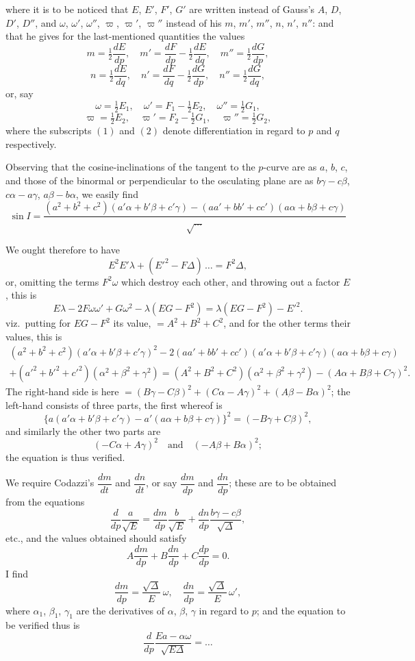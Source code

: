 \documentclass[11pt,a4paper]{book}
\begin{document}
where it is to be noticed that $E$, $E'$, $F'$, $G'$ are written instead of Gauss's $A$, $D$, $D'$, $D''$,
and $\omega$, $\omega'$, $\omega''$, $\varpi$, $\varpi'$, $\varpi''$ instead of his $m$, $m'$, $m''$, $n$, $n'$, $n''$:
and that he gives for the last-mentioned quantities the values
\[
m = \tfrac12\frac{dE}{dp}, \quad m' = \frac{dF}{dp} - \tfrac12\frac{dE}{dq}, \quad
m'' = \tfrac12\frac{dG}{dp},
\]
\[
n = \tfrac12\frac{dE}{dq}, \quad n' = \frac{dF}{dq} - \tfrac12\frac{dG}{dp}, \quad
n'' = \tfrac12\frac{dG}{dq},
\]
or, say
\[
\omega = \tfrac12 E_1, \quad \omega' = F_1 - \tfrac12 E_2, \quad \omega'' = \tfrac12 G_1,
\]
\[
\varpi = \tfrac12 E_2, \quad \varpi' = F_2 - \tfrac12 G_1, \quad \varpi'' = \tfrac12 G_2,
\]
where the subscripts $(1)$ and $(2)$ denote differentiation in regard to $p$ and $q$ respectively.

Observing that the cosine-inclinations of the tangent to the $p$-curve are as $a$, $b$, $c$,
and those of the binormal or perpendicular to the osculating plane are as $b\gamma - c\beta$,
$c\alpha - a\gamma$, $a\beta - b\alpha$, we easily find
\[
\sin I = \frac{(a^2+b^2+c^2)(a'\alpha+b'\beta+c'\gamma) - (aa'+bb'+cc')(a\alpha+b\beta+c\gamma)}{\sqrt{\ldots}}
\]

We ought therefore to have
\[
E^2E'\lambda + (E'^2 - F\Delta)\,\ldots = F^2\Delta,
\]
or, omitting the terms $F^2\omega$ which destroy each other, and throwing out a factor $E$,
this is
\[
E\lambda - 2F\omega\omega' + G\omega^2 - \lambda(EG-F^2)
= \lambda(EG-F^2) - E'^2.
\]
viz.\ putting for $EG-F^2$ its value, $=A^2+B^2+C^2$, and for the other terms their
values, this is
\begin{multline*}
(a^2+b^2+c^2)(a'\alpha+b'\beta+c'\gamma)^2
- 2(aa'+bb'+cc')(a'\alpha+b'\beta+c'\gamma)(a\alpha+b\beta+c\gamma)\\
+(a'^2+b'^2+c'^2)(\alpha^2+\beta^2+\gamma^2)
= (A^2+B^2+C^2)(\alpha^2+\beta^2+\gamma^2) - (A\alpha+B\beta+C\gamma)^2.
\end{multline*}
The right-hand side is here $= (B\gamma - C\beta)^2 + (C\alpha - A\gamma)^2 + (A\beta - B\alpha)^2$;
the left-hand consists of three parts, the first whereof is
\[
\{a(a'\alpha+b'\beta+c'\gamma) - a'(a\alpha+b\beta+c\gamma)\}^2 = (-B\gamma + C\beta)^2,
\]
and similarly the other two parts are
\[
(-C\alpha + A\gamma)^2 \quad \text{and} \quad (-A\beta + B\alpha)^2;
\]
the equation is thus verified.

We require Codazzi's $\dfrac{dm}{dt}$ and $\dfrac{dn}{dt}$, or say $\dfrac{dm}{dp}$ and $\dfrac{dn}{dp}$;
these are to be obtained from the equations
\[
\frac{d}{dp}\frac{a}{\sqrt{E}} = \frac{dm}{dp}\frac{b}{\sqrt{E}} + \frac{dn}{dp}\frac{b\gamma-c\beta}{\sqrt{\Delta}},
\]
etc., and the values obtained should satisfy
\[
A\frac{dm}{dp} + B\frac{dn}{dp} + C\frac{dp}{dp} = 0.
\]
I find
\[
\frac{dm}{dp} = \frac{\sqrt{\Delta}}{E}\,\omega, \quad
\frac{dn}{dp} = \frac{\sqrt{\Delta}}{E}\,\omega',
\]
where $\alpha_1$, $\beta_1$, $\gamma_1$ are the derivatives of $\alpha$, $\beta$, $\gamma$ in regard to $p$;
and the equation to be verified thus is
\[
\frac{d}{dp}\frac{Ea - \alpha\omega}{\sqrt{E\Delta}} = \ldots
\]
\end{document}
